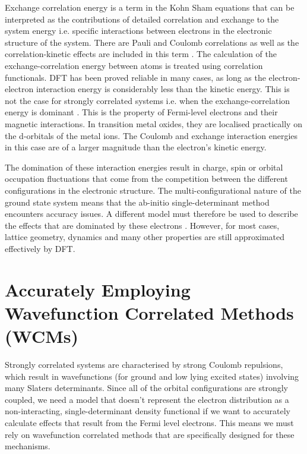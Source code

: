 \documentclass[10pt]{article}
\begin{document}
Exchange correlation energy is a term in the Kohn Sham equations that can be interpreted as the contributions of detailed correlation and exchange to the system energy i.e. specific interactions between electrons in the electronic structure of the system. There are Pauli and Coulomb correlations as well as the correlation-kinetic effects are included in this term \cite{kohn1965self,refson2006variational}. The calculation of the exchange-correlation energy between atoms is treated using correlation functionals. DFT has been proved reliable in many cases, as long as the electron-electron interaction energy is considerably less than the kinetic energy. This is not the case for strongly correlated systems i.e. when the exchange-correlation energy is dominant \cite{pickett1989electronic}. This is the property of Fermi-level electrons and their magnetic interactions. In transition metal oxides, they are localised practically on the d-orbitals of the metal ions. The Coulomb and exchange interaction energies in this case are of a larger magnitude than the electron's kinetic energy.

The domination of these interaction energies result in charge, spin or orbital occupation fluctuations that come from the competition between the different configurations in the electronic structure. The multi-configurational nature of the ground state system means that the ab-initio single-determinant method encounters accuracy issues. A different model must therefore be used to describe the effects that are dominated by these electrons \cite{gelle2009accurate}. However, for most cases, lattice geometry, dynamics and many other properties are still approximated effectively by DFT.

\section{Accurately Employing Wavefunction Correlated Methods (WCMs)}

Strongly correlated systems are characterised by strong Coulomb repulsions, which result in wavefunctions (for ground and low lying excited states) involving many Slaters determinants. Since all of the orbital configurations are strongly coupled, we need a model that doesn't represent the electron distribution as a non-interacting, single-determinant density functional if we want to accurately calculate effects that result from the Fermi level electrons. This means we must rely on wavefunction correlated methods that are specifically designed for these mechanisms. 
\end{document}
